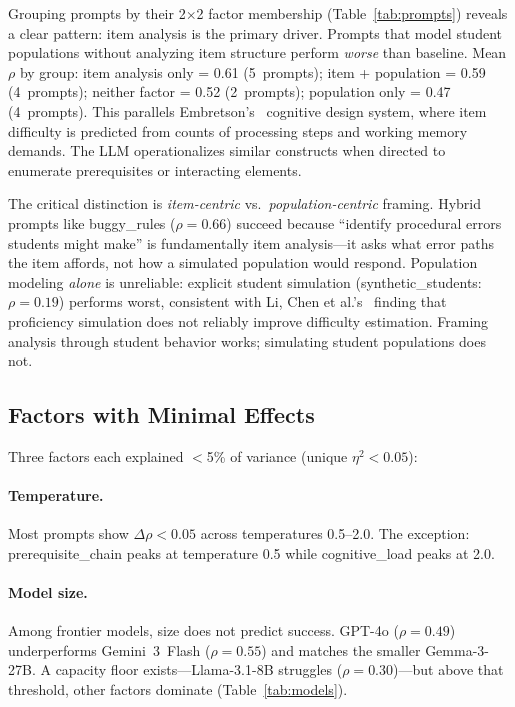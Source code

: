 \documentclass[runningheads]{llncs}
\begin{document}
Grouping prompts by their 2$\times$2 factor membership (Table~\ref{tab:prompts}) reveals a clear pattern: item analysis is the primary driver. Prompts that model student populations without analyzing item structure perform \emph{worse} than baseline. Mean $\rho$ by group: item analysis only = 0.61 (5~prompts); item + population = 0.59 (4~prompts); neither factor = 0.52 (2~prompts); population only = 0.47 (4~prompts). This parallels Embretson's~\cite{embretson1998} cognitive design system, where item difficulty is predicted from counts of processing steps and working memory demands. The LLM operationalizes similar constructs when directed to enumerate prerequisites or interacting elements.

The critical distinction is \emph{item-centric} vs.\ \emph{population-centric} framing. Hybrid prompts like buggy\_rules ($\rho=0.66$) succeed because ``identify procedural errors students might make'' is fundamentally item analysis---it asks what error paths the item affords, not how a simulated population would respond. Population modeling \emph{alone} is unreliable: explicit student simulation (synthetic\_students: $\rho=0.19$) performs worst, consistent with Li, Chen et al.'s~\cite{lichen2025} finding that proficiency simulation does not reliably improve difficulty estimation. Framing analysis through student behavior works; simulating student populations does not.

\subsection{Factors with Minimal Effects}

Three factors each explained $<$5\% of variance (unique $\eta^2 < 0.05$):

\paragraph{Temperature.} Most prompts show $\Delta\rho<0.05$ across temperatures 0.5--2.0. The exception: prerequisite\_chain peaks at temperature 0.5 while cognitive\_load peaks at 2.0.

\paragraph{Model size.} Among frontier models, size does not predict success. GPT-4o ($\rho=0.49$) underperforms Gemini~3~Flash ($\rho=0.55$) and matches the smaller Gemma-3-27B. A capacity floor exists---Llama-3.1-8B struggles ($\rho=0.30$)---but above that threshold, other factors dominate (Table~\ref{tab:models}).
\end{document}

